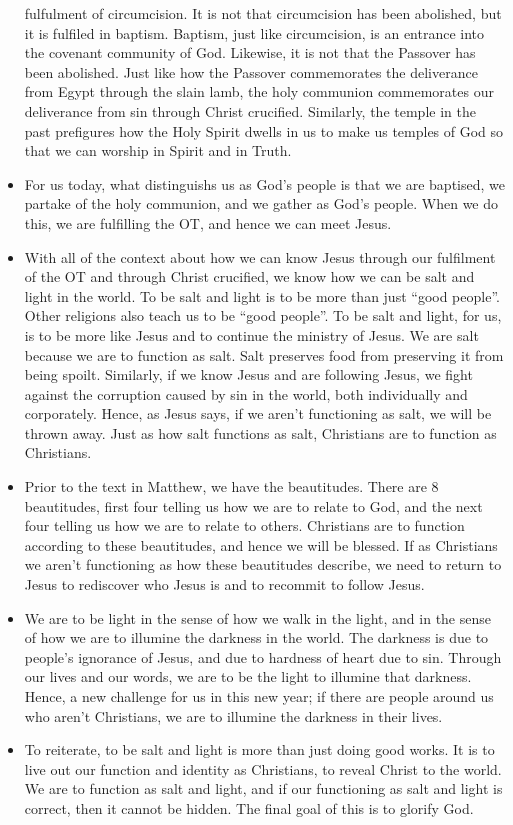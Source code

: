 \begin{itemize}
{  fulfulment of circumcision.  It is not that circumcision has been
  abolished, but it is fulfiled in baptism.  Baptism, just like circumcision,
  is an entrance into the covenant community of God.  Likewise, it is not
  that the Passover has been abolished.  Just like how the Passover
  commemorates the deliverance from Egypt through the slain lamb, the holy
  communion commemorates our deliverance from sin through Christ crucified.
  Similarly, the temple in the past prefigures how the Holy Spirit dwells in
  us to make us temples of God so that we can worship in Spirit and in
  Truth.}
  \item{For us today, what distinguishs us as God's people is that we are
  baptised, we partake of the holy communion, and we gather as God's people.
  When we do this, we are fulfilling the OT, and hence we can meet Jesus.}
  \item{With all of the context about how we can know Jesus through our
  fulfilment of the OT and through Christ crucified, we know how we can be
  salt and light in the world.  To be salt and light is to be more than just
  ``good people''.  Other religions also teach us to be ``good people''.  To
  be salt and light, for us, is to be more like Jesus and to continue the
  ministry of Jesus.  We are salt because we are to function as salt.  Salt
  preserves food from preserving it from being spoilt.  Similarly, if we know
  Jesus and are following Jesus, we fight against the corruption caused by
  sin in the world, both individually and corporately.  Hence, as Jesus says,
  if we aren't functioning as salt, we will be thrown away.  Just as how salt
  functions as salt, Christians are to function as Christians.}
  \item{Prior to the text in Matthew, we have the beautitudes.  There are 8
  beautitudes, first four telling us how we are to relate to God, and the
  next four telling us how we are to relate to others.  Christians are to
  function according to these beautitudes, and hence we will be blessed.  If
  as Christians we aren't functioning as how these beautitudes describe, we
  need to return to Jesus to rediscover who Jesus is and to recommit to
  follow Jesus.  }
  \item{We are to be light in the sense of how we walk in the light, and in
  the sense of how we are to illumine the darkness in the world.  The
  darkness is due to people's ignorance of Jesus, and due to hardness of
  heart due to sin.  Through our lives and our words, we are to be the light
  to illumine that darkness.  Hence, a new challenge for us in this new year; if
  there are people around us who aren't Christians, we are to illumine the
  darkness in their lives.}
  \item{To reiterate, to be salt and light is more than just doing good works. It is to live out our function and identity as Christians, to reveal Christ to the world. We are to function as salt and light, and if our functioning as salt and light is correct, then it cannot be hidden. The final goal of this is to glorify God. }
\end{itemize}